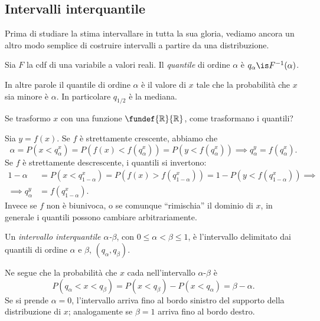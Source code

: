 
\subsection{Intervalli interquantile}

Prima di studiare la stima intervallare in tutta la sua gloria, vediamo ancora
un altro modo semplice di costruire intervalli a partire da una distribuzione.

\begin{definition}[Quantile]
    Sia $F$ la cdf di una variabile a valori reali. Il \emph{quantile} di
    ordine $\alpha$ è $q_\alpha \is F^{-1}(\alpha)$.
\end{definition}%
%
In altre parole il quantile di ordine $\alpha$ è il valore di $x$ tale che
la probabilità che $x$ sia minore è $\alpha$. In particolare $q_{1/2}$ è la
mediana.

\begin{exercise}
    Se trasformo $x$ con una funzione $\fundef{\mathbb R}{\mathbb R}$, come
    trasformano i quantili?
\end{exercise}

\begin{solution}
    Sia $y = f(x)$. Se $f$ è strettamente crescente, abbiamo che
    \begin{equation*}
        \alpha = P(x < q^x_\alpha)
        = P(f(x) < f(q^x_\alpha))
        = P(y < f(q^x_\alpha))
        \implies q^y_\alpha = f(q^x_\alpha).
    \end{equation*}
    Se $f$ è strettamente descrescente, i quantili si invertono:
    \begin{align*}
        1 - \alpha &= P(x < q^x_{1-\alpha})
        = P(f(x) > f(q^x_{1-\alpha}))
        = 1 - P(y < f(q^x_{1-\alpha}))
        \implies \\
        \implies q^y_\alpha &= f(q^x_{1-\alpha}).
    \end{align*}
    Invece se $f$ non è biunivoca, o se comunque ``rimischia'' il dominio
    di $x$, in generale i quantili possono cambiare arbitrariamente.
\end{solution}

\begin{definition}
    Un \emph{intervallo interquantile $\alpha$-$\beta$}, con $0 \le \alpha <
    \beta \le 1$, è l'intervallo delimitato dai quantili di ordine $\alpha$
    e $\beta$, $(q_\alpha, q_\beta)$.
\end{definition}%
%
Ne segue che la probabilità che $x$ cada nell'intervallo $\alpha$-$\beta$ è
%
\begin{equation*}
    P(q_\alpha < x < q_\beta)
    = P(x < q_\beta) - P(x < q_\alpha)
    = \beta - \alpha.
\end{equation*}
%
Se si prende $\alpha = 0$, l'intervallo arriva fino al bordo sinistro del
supporto della distribuzione di $x$; analogamente se $\beta = 1$ arriva fino
al bordo destro.

